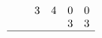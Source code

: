 \begin{frame}\hfil\hfil$\begin{array}{cccccc}&&&&&\\&&3&4&0&0\\&&&&3&3\\\hline&&&&&\end{array}$
\end{frame}
